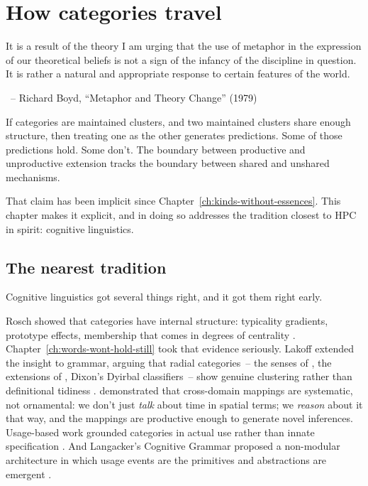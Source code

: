 \chapter{How categories travel}
\label{ch:how-categories-travel}
\epigraph{It is a result of the theory I am urging that the use of metaphor in the expression of our theoretical beliefs is not a sign of the infancy of the discipline in question. It is rather a natural and appropriate response to certain features of the world.}{~-- Richard Boyd, \enquote{Metaphor and Theory Change} (1979)}

If categories are maintained clusters, and two maintained clusters share enough structure, then treating one as the other generates predictions. Some of those predictions hold. Some don't. The boundary between productive and unproductive extension tracks the boundary between shared and unshared mechanisms.

That claim has been implicit since Chapter~\ref{ch:kinds-without-essences}. This chapter makes it explicit, and in doing so addresses the tradition closest to HPC in spirit: cognitive linguistics.

\section{The nearest tradition}
\label{sec:16c:nearest-tradition}

Cognitive linguistics got several things right, and it got them right early.

Rosch showed that categories have internal structure: typicality gradients, prototype effects, membership that comes in degrees of centrality \citep{rosch1975}. Chapter~\ref{ch:words-wont-hold-still} took that evidence seriously. Lakoff extended the insight to grammar, arguing that radial categories~-- the senses of , the extensions of , Dixon's Dyirbal classifiers~-- show genuine clustering rather than definitional tidiness \citep{lakoff1987}. \textcite{lakoff1980} demonstrated that cross-domain mappings are systematic, not ornamental: we don't just \emph{talk} about time in spatial terms; we \emph{reason} about it that way, and the mappings are productive enough to generate novel inferences. Usage-based work grounded categories in actual use rather than innate specification \citep{bybee2010,goldberg1995constructions,croft2001}. And Langacker's Cognitive Grammar proposed a non-modular architecture in which usage events are the primitives and abstractions are emergent \citep{langacker1987foundations}.


